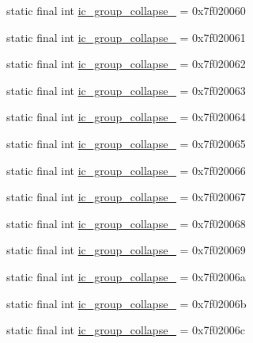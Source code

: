 \begin{CompactItemize}
static final int \hyperlink{classandroid_1_1support_1_1v7_1_1mediarouter_1_1_r_1_1drawable_f2bbf3e038da1a1d5a585a88bb427fb3}{ic\_\-group\_\-collapse\_} = 0x7f020060
\item 
static final int \hyperlink{classandroid_1_1support_1_1v7_1_1mediarouter_1_1_r_1_1drawable_a956690bbabcef07d3a0db6f199c922f}{ic\_\-group\_\-collapse\_} = 0x7f020061
\item 
static final int \hyperlink{classandroid_1_1support_1_1v7_1_1mediarouter_1_1_r_1_1drawable_8f79f512ff4ba83a498f1e2d0e705d02}{ic\_\-group\_\-collapse\_} = 0x7f020062
\item 
static final int \hyperlink{classandroid_1_1support_1_1v7_1_1mediarouter_1_1_r_1_1drawable_38f9bbc8341de31f5522c3a0c4e98da8}{ic\_\-group\_\-collapse\_} = 0x7f020063
\item 
static final int \hyperlink{classandroid_1_1support_1_1v7_1_1mediarouter_1_1_r_1_1drawable_bf7676f832289c64249b850df7683985}{ic\_\-group\_\-collapse\_} = 0x7f020064
\item 
static final int \hyperlink{classandroid_1_1support_1_1v7_1_1mediarouter_1_1_r_1_1drawable_3189a9495ef33ac5e719c6090e9d6e4a}{ic\_\-group\_\-collapse\_} = 0x7f020065
\item 
static final int \hyperlink{classandroid_1_1support_1_1v7_1_1mediarouter_1_1_r_1_1drawable_a6fab278556ac8cfef29655d1ccba96d}{ic\_\-group\_\-collapse\_} = 0x7f020066
\item 
static final int \hyperlink{classandroid_1_1support_1_1v7_1_1mediarouter_1_1_r_1_1drawable_39ee53423034c25653718c0254139358}{ic\_\-group\_\-collapse\_} = 0x7f020067
\item 
static final int \hyperlink{classandroid_1_1support_1_1v7_1_1mediarouter_1_1_r_1_1drawable_464e3b3f27b65d4255def24acaace721}{ic\_\-group\_\-collapse\_} = 0x7f020068
\item 
static final int \hyperlink{classandroid_1_1support_1_1v7_1_1mediarouter_1_1_r_1_1drawable_2849ec045d2a0845a6ba08855d4ebeff}{ic\_\-group\_\-collapse\_} = 0x7f020069
\item 
static final int \hyperlink{classandroid_1_1support_1_1v7_1_1mediarouter_1_1_r_1_1drawable_379462506799634e0972afba47991242}{ic\_\-group\_\-collapse\_} = 0x7f02006a
\item 
static final int \hyperlink{classandroid_1_1support_1_1v7_1_1mediarouter_1_1_r_1_1drawable_2b4012730fca7ee37be3711c34c3b12b}{ic\_\-group\_\-collapse\_} = 0x7f02006b
\item 
static final int \hyperlink{classandroid_1_1support_1_1v7_1_1mediarouter_1_1_r_1_1drawable_77f61a3182558705dd6e02db38ffd22d}{ic\_\-group\_\-collapse\_} = 0x7f02006c

\end{CompactItemize}
